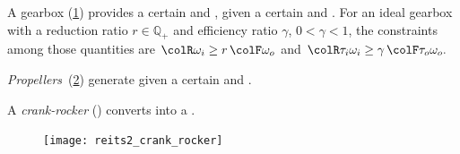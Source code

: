 \begin{example}
A gearbox (\cref{fig:gearbox}) provides a certain  and , given a certain
 and . For
an ideal gearbox with a reduction ratio $r \in \mathbb{Q}_+$ and
efficiency ratio $\gamma$, $0<\gamma<1$, the constraints among
those quantities are ${\colR \omega_i}\geq r\,{\colF \omega_o}$
and ${\colR \tau_i\omega_i}\geq\gamma\,{\colF \tau_o\omega_o}.$
\end{example}

\begin{figure}[h]
\begin{center}
\end{center}
\caption{\label{fig:gearbox}}
\end{figure}


\begin{example}
\emph{Propellers}~(\cref{fig:propeller}) generate 
given a certain  and .
\end{example}

\begin{figure}[h]
\begin{center}
\end{center}
\caption{\label{fig:propeller}}
\end{figure}

\begin{example}
A \emph{crank-rocker} () converts  into a .
\end{example}

\begin{figure}[h!] 
    \centering
    \texttt{[image: reits2\_crank\_rocker]}
    \caption{
        \label{fig:crack}}
    \end{figure}

